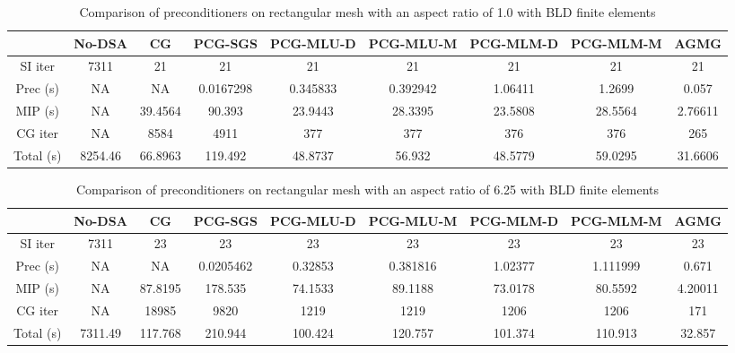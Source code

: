 \begin{landscape}
  \begin{center}
    \begin{table}[H]
      \caption{Comparison of preconditioners on rectangular mesh with an aspect ratio of 1.0 with BLD finite elements}
      \begin{tabular}{|c|c|c|c|c|c|c|c|c|}
        \hline
        & No-DSA & CG & PCG-SGS & PCG-MLU-D & PCG-MLU-M & PCG-MLM-D & PCG-MLM-M & AGMG \\
        \hline
        SI iter    & 7311    & 21      & 21        & 21       & 21       & 21      & 21      & 21      \\
        Prec (s)   & NA      & NA      & 0.0167298 & 0.345833 & 0.392942 & 1.06411 & 1.2699  & 0.057   \\
        MIP (s)    & NA      & 39.4564 & 90.393    & 23.9443  & 28.3395  & 23.5808 & 28.5564 & 2.76611 \\
        CG iter    & NA      & 8584    & 4911      & 377      & 377      & 376     & 376     & 265     \\
        Total (s)  & 8254.46 & 66.8963 & 119.492   & 48.8737  & 56.932   & 48.5779 & 59.0295 & 31.6606 \\
        \hline
      \end{tabular}
      \label{bld_ar_1}      
    \end{table}
    \begin{table}[H]
    \caption{Comparison of preconditioners on rectangular mesh with an aspect ratio of 6.25 with BLD finite elements}  
      \begin{tabular}{|c|c|c|c|c|c|c|c|c|}
        \hline
        & No-DSA & CG & PCG-SGS & PCG-MLU-D & PCG-MLU-M & PCG-MLM-D & PCG-MLM-M & AGMG \\
        \hline
        SI iter    & 7311    & 23      & 23        & 23      & 23       & 23      & 23       & 23      \\
        Prec (s)   & NA      & NA      & 0.0205462 & 0.32853 & 0.381816 & 1.02377 & 1.111999 & 0.671   \\
        MIP (s)    & NA      & 87.8195 & 178.535   & 74.1533 & 89.1188  & 73.0178 & 80.5592  & 4.20011 \\
        CG iter    & NA      & 18985   & 9820      & 1219    & 1219     & 1206    & 1206     & 171     \\
        Total (s)  & 7311.49 & 117.768 & 210.944   & 100.424 & 120.757  & 101.374 & 110.913  & 32.857  \\
        \hline
      \end{tabular}

\end{table}
\end{center}
\end{landscape}
